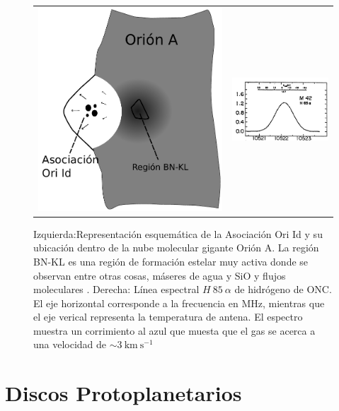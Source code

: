 \begin{figure}
  \begin{tabular}{lr}
    \includegraphics[width=0.5\linewidth]{./Figures/champagne} &
    \includegraphics[width=0.5\linewidth]{./Figures/H85-alpha}
    \end{tabular}
  \caption{Izquierda:Representación esquemática de la Asociación Ori Id y su ubicación dentro de la nube molecular gigante Orión A. La región BN-KL es una región de formación estelar muy activa donde se observan entre otras cosas, máseres de agua y SiO y flujos moleculares \citep{Stahler:2004}. Derecha: Línea espectral $H~85~\alpha$ de hidrógeno de ONC. El eje horizontal corresponde a la frecuencia en MHz, mientras que el eje verical representa la temperatura de antena. El espectro muestra un corrimiento al azul que muesta que el gas se acerca a una velocidad de $\sim 3\mathrm{~km~s^{-1}}$ \citep{Stahler:2004, Churchwell:1970}}
  \label{fig:champagne}
\end{figure}


\section{Discos Protoplanetarios}
